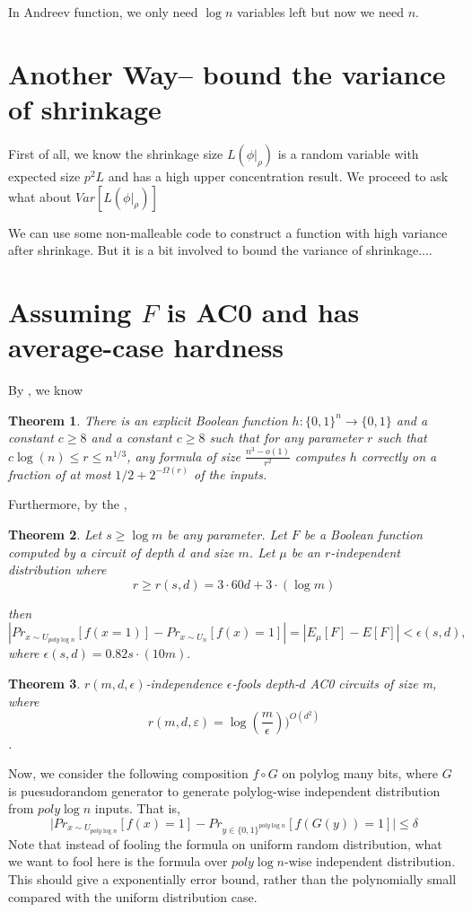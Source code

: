 \documentclass[12pt]{article}
\newtheorem{theorem}{Theorem}[section]
\renewcommand{\.}{,\ldots,}
\begin{document}
In Andreev function, we only need $\log n$ variables left but now we need $n$. 


\section{Another Way-- bound the variance of shrinkage}
First of all, we know the shrinkage size $L(\phi|_{\rho})$ is a random variable with expected size $p^2L$ and has a high upper concentration result. We proceed to ask what about $Var[L(\phi|_\rho)]$

We can use some non-malleable code to construct a function with high variance after shrinkage. But it is a bit involved to bound the variance of shrinkage....
\section{Assuming $F$ is AC0 and has average-case hardness }
\label{sec:AC0} 
By \cite{komargodski2013improved}, we know 
\begin{theorem}
There is an explicit Boolean function $h:\{0,1\}^n\rightarrow \{0,1\}$ and a constant $c\geq 8$ and a constant $c\geq 8$ such that for  any parameter $r$ such that $c\log(n)\leq r\le n^{1/3}$, any formula of size $\frac{n^3-o(1)}{r^2}$ computes $h$ correctly on a fraction of at most $1/2+2^{-\Omega(r)}$ of the inputs. 
\end{theorem}

Furthermore, by the \cite{braverman2010polylogarithmic},
\begin{theorem}
Let $s \ge \log m$ be any parameter. Let $F$ be a Boolean function
computed by a circuit of depth $d$ and size $m$. Let $\mu$ be an $r$-independent distribution
where
$$r \geq  r(s, d) = 3 \cdot 60d+3 \cdot (\log m)$$

then
$$|Pr_{x\sim U_{poly\log n}}[f(x=1)]-Pr_{x\sim U_n}[f(x)=1]|=|E_\mu[F] -E[F]| < \epsilon(s, d),$$
where $\epsilon(s, d) = 0.82s \cdot(10m).$
\end{theorem}
\begin{theorem}
$r(m, d,\epsilon)$-independence $\epsilon$-fools depth-$d$ AC0 circuits of size
m, where
$$r(m, d, ε)=\log(\frac{m}{\epsilon}))^{O(d^2)}$$. 
\end{theorem}

Now, we consider the following composition $f\circ G$ on polylog many bits, where $G$ is puesudorandom generator to generate polylog-wise independent distribution from $poly\log n$ inputs. That is, 
$$\big|Pr_{x\sim U_{poly\log n}}[f(x)=1]-Pr_{y\in\{0,1\}^{poly\log n}}[f(G(y))=1]\big|\leq \delta$$
Note that instead of fooling the formula on uniform random distribution, what we want to fool here is the formula over $poly\log n$-wise independent distribution. This should give a exponentially error bound, rather than the polynomially small compared with the uniform distribution case. 
\end{document}
